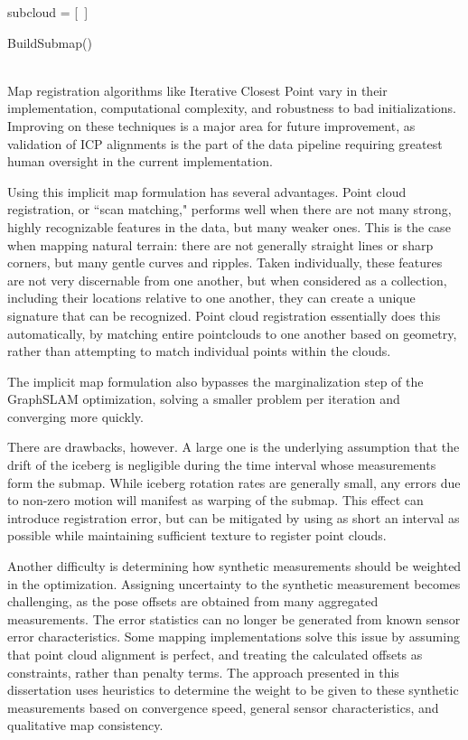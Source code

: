 \begin{algorithm}[H]
\DontPrintSemicolon
\label{alg.submap}
\SetAlgoLined
{}
subcloud = [~] \;
\caption{BuildSubmap() \label{BSM}}
\end{algorithm}
~\\

Map registration algorithms like Iterative Closest Point vary in their implementation, computational complexity, and robustness to bad initializations. Improving on these techniques is a major area for future improvement, as validation of ICP alignments is the part of the data pipeline requiring greatest human oversight in the current implementation.

Using this implicit map formulation has several advantages. Point cloud registration, or ``scan matching," performs well when there are not many strong, highly recognizable features in the data, but many weaker ones. This is the case when mapping natural terrain: there are not generally straight lines or sharp corners, but many gentle curves and ripples. Taken individually, these features are not very discernable from one another, but when considered as a collection, including their locations relative to one another, they can create a unique signature that can be recognized. Point cloud registration essentially does this automatically, by matching entire pointclouds to one another based on geometry, rather than attempting to match individual points within the clouds.

The implicit map formulation also bypasses the marginalization step of the GraphSLAM optimization, solving a smaller problem per iteration and converging more quickly. 

There are drawbacks, however. A large one is the underlying assumption that the drift of the iceberg is negligible during the time interval whose measurements form the submap. While iceberg rotation rates are generally small, any errors due to non-zero motion will manifest as warping of the submap. This effect can introduce registration error, but can be mitigated by using as short an interval as possible while maintaining sufficient texture to register point clouds.

Another difficulty is determining how synthetic measurements should be weighted in the optimization. Assigning uncertainty to the synthetic measurement becomes challenging, as the pose offsets are obtained from many aggregated measurements. The error statistics can no longer be generated from known sensor error characteristics. Some mapping implementations solve this issue by assuming that point cloud alignment is perfect, and treating the calculated offsets as constraints, rather than penalty terms. The approach presented in this dissertation uses heuristics to determine the weight to be given to these synthetic measurements based on convergence speed, general sensor characteristics, and qualitative map consistency. 






